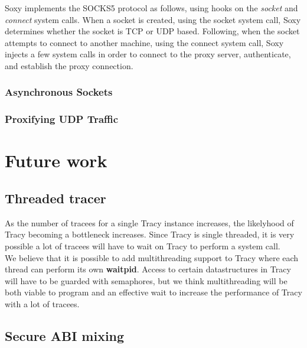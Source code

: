 \documentclass[a4paper, 10pt]{report}
\begin{document}
Soxy implements the SOCKS5 protocol as follows, using hooks on the
\textit{socket} and \textit{connect} system calls. When a
socket is created, using the socket system call, Soxy determines whether the
socket is TCP or UDP based. Following, when the socket attempts to connect to
another machine, using the connect system call, Soxy injects a few system
calls in order to connect to the proxy server, authenticate, and establish the
proxy connection.

\subsection{Asynchronous Sockets}

\subsection{Proxifying UDP Traffic}

\chapter{Future work}

\section{Threaded tracer}

As the number of tracees for a single Tracy instance increases, the
likelyhood of Tracy becoming a bottleneck increases. Since Tracy is
single threaded, it is very possible a lot of tracees will have to wait
on Tracy to perform a system call. \\

We believe that it is possible to add multithreading support to Tracy where
each thread can perform its own \textbf{waitpid}. Access to certain
datastructures in Tracy will have to be guarded with semaphores, but
we think multithreading will be both viable to program and an effective
wait to increase the performance of Tracy with a lot of tracees.

\section{Secure ABI mixing}
\label{secure-abi}
\end{document}
